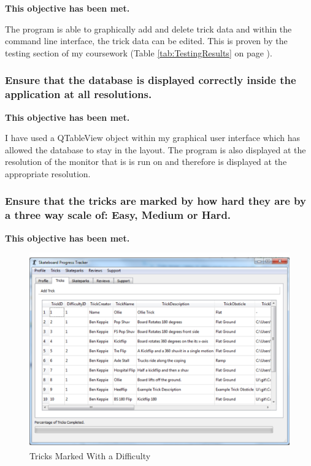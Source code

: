 \textbf{This objective has been met.}

The program is able to graphically add and delete trick data and within the command line interface, the trick data can be edited. This is proven by the testing section of my coursework (Table \ref{tab:TestingResults} on page \pageref{tab:TestingResults}).

\subsubsection {Ensure that the database is displayed correctly inside the application at all resolutions.}

\textbf{This objective has been met.}

I have used a QTableView object within my graphical user interface which has allowed the database to stay in the layout. The program is also displayed at the resolution of the monitor that is is run on and therefore is displayed at the appropriate resolution.

\subsubsection {Ensure that the tricks are marked by how hard they are by a three way scale of: Easy, Medium or Hard.}

\textbf{This objective has been met.}

\begin{figure}[H]
    \includegraphics[width=\textwidth]{./Evaluation/images/TricksTableNFS.pdf}
    \caption{Tricks Marked With a Difficulty} \label{fig:TricksTableDiff}
\end{figure}

